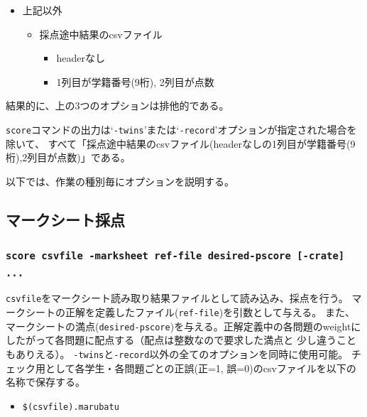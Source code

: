 \begin{itemize}
\begin{itemize}
\begin{itemize}
\end{itemize}

\end{itemize}

\item 上記以外

\begin{itemize}
\item 採点途中結果のcsvファイル

\begin{itemize}
\item headerなし

\item 1列目が学籍番号(9桁), 2列目が点数

\end{itemize}

\end{itemize}

\end{itemize}
結果的に、上の3つのオプションは排他的である。

\texttt{score}コマンドの出力は`\texttt{-twins}'または`\texttt{-record}'オプションが指定された場合を除いて、
すべて「採点途中結果のcsvファイル(headerなしの1列目が学籍番号(9桁),2列目が点数)」である。

以下では、作業の種別毎にオプションを説明する。

\subsection{マークシート採点}
\label{マークシート採点}

\subsubsection{\texttt{score csvfile -marksheet ref-file desired-pscore [-crate] ...}}
\label{scorecsvfile-marksheetref-filedesired-pscore-crate...}

\texttt{csvfile}をマークシート読み取り結果ファイルとして読み込み、採点を行う。
マークシートの正解を定義したファイル(\texttt{ref-file})を引数として与える。
また、マークシートの満点(\texttt{desired-pscore})を与える。正解定義中の各問題のweightに
したがって各問題に配点する（配点は整数なので要求した満点と
少し違うこともありえる）。
\texttt{-twins}と\texttt{-record}以外の全てのオプションを同時に使用可能。
チェック用として各学生・各問題ごとの正誤(正=1, 誤=0)のcsvファイルを以下の
名称で保存する。

\begin{itemize}
\item \texttt{\$(csvfile).marubatu}

\end{itemize}

